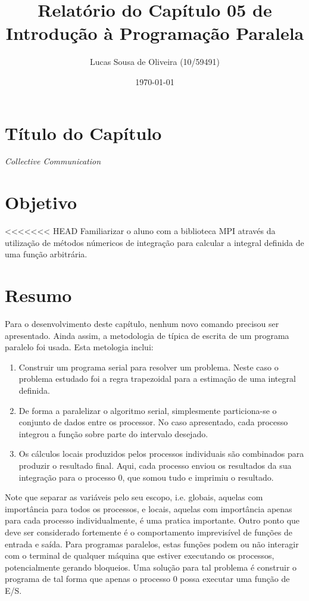 \documentclass[11pt,a4paper,onecolumn]{article}
\title{Relatório do Capítulo 05 de\\Introdução à Programação Paralela}
\author{Lucas Sousa de Oliveira (10/59491)}
\date{\today}
\begin{document}
\maketitle

\section{Título do Capítulo}
\textit{Collective Communication}

\section{Objetivo}
<<<<<<< HEAD
Familiarizar o aluno com a biblioteca MPI através da utilização de métodos númericos de integração para calcular a integral definida de uma função arbitrária.

\section{Resumo}
\label{sec:resumo}
Para o desenvolvimento deste capítulo, nenhum novo comando precisou ser apresentado.
Ainda assim, a metodologia de típica de escrita de um programa paralelo foi usada.
Esta metologia inclui:
\begin{enumerate}
\item Construir um programa serial para resolver um problema.
Neste caso o problema estudado foi a regra trapezoidal para a estimação de uma integral definida.
\item De forma a paralelizar o algoritmo serial, simplesmente particiona-se o conjunto de dados entre os processor.
No caso apresentado, cada processo integrou a função sobre parte do intervalo desejado.
\item Os cálculos locais produzidos pelos processos individuais são combinados para produzir o resultado final.
Aqui, cada processo enviou os resultados da sua integração para o processo 0, que somou tudo e imprimiu o resultado.
\end{enumerate}

Note que separar as variáveis pelo seu escopo, i.e. globais, aquelas com importância para todos os processos, e locais, aquelas com importância apenas para cada processo individualmente, é uma pratica importante.
Outro ponto que deve ser considerado fortemente é o comportamento imprevisível de funções de entrada e saída.
Para programas paralelos, estas funções podem ou não interagir com o terminal de qualquer máquina que estiver executando os processos, potencialmente gerando bloqueios.
Uma solução para tal problema é construir o programa de tal forma que apenas o processo 0 possa executar uma função de E/S.
\end{document}
